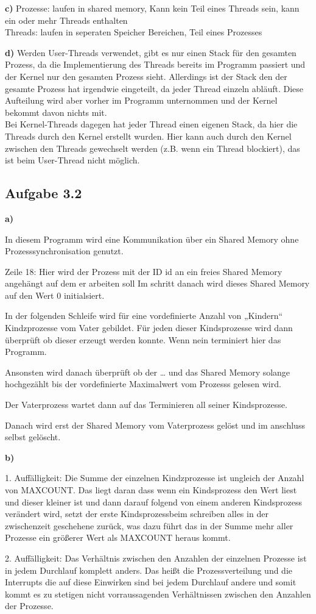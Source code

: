 \documentclass[a4paper,graphics,11pt]{article}
\newcommand{\aufgabe}[1]{\subsection*{Aufgabe #1}}
\begin{document}
\textbf{c)}
Prozesse: laufen in shared memory, Kann kein Teil eines Threads sein, kann ein oder mehr Threads enthalten\\
Threads: laufen in seperaten Speicher Bereichen, Teil eines Prozesses \\

\newpage

\textbf{d)}
Werden User-Threads verwendet, gibt es nur einen Stack für den gesamten Prozess, da die Implementierung des Threads bereits im Programm passiert und der Kernel nur den gesamten Prozess sieht. Allerdings ist der Stack den der gesamte Prozess hat irgendwie eingeteilt, da jeder Thread einzeln abläuft. Diese Aufteilung wird aber vorher im Programm unternommen und der Kernel bekommt davon nichts mit. \\
Bei Kernel-Threads dagegen hat jeder Thread einen eigenen Stack, da hier die Threads durch den Kernel erstellt wurden. Hier kann auch durch den Kernel zwischen den Threads gewechselt werden (z.B. wenn ein Thread blockiert), das ist beim User-Thread nicht möglich.

\aufgabe{3.2}

\textbf{a)}

In diesem Programm wird eine Kommunikation über ein Shared Memory ohne Prozesssynchronisation genutzt.

Zeile 18:
Hier wird der Prozess mit der ID id an ein freies Shared Memory angehängt auf dem er arbeiten soll
Im schritt danach wird dieses Shared Memory auf den Wert 0 initialsiert.

In der folgenden Schleife wird für eine vordefinierte Anzahl von „Kindern“ Kindzprozesse vom Vater gebildet.
Für jeden dieser Kindsprozesse wird dann überprüft ob dieser erzeugt werden konnte. Wenn nein terminiert hier das Programm.

Ansonsten wird danach überprüft ob der … und das Shared Memory solange hochgezählt bis der vordefinierte Maximalwert vom Prozesss gelesen wird.

Der Vaterprozess wartet dann auf das Terminieren all seiner Kindsprozesse.

Danach wird erst der Shared Memory vom Vaterprozess gelöst und im anschluss selbst gelöscht.


\textbf{b)}

1. Auffälligkeit:
Die Summe der einzelnen Kindzprozesse ist ungleich der Anzahl von MAXCOUNT. Das liegt daran dass wenn ein Kindsprozess den Wert liest und dieser kleiner ist und dann darauf folgend von einem anderen Kindsprozess verändert wird, setzt der erste Kindsprozessbeim schreiben alles in der zwischenzeit geschehene zurück, was dazu führt das in der Summe mehr aller Prozesse ein größerer Wert als MAXCOUNT heraus kommt.

2. Auffälligkeit:
Das Verhältnis zwischen den Anzahlen der einzelnen Prozesse ist in jedem Durchlauf komplett anders. Das heißt die Prozessverteilung und die Interrupts die auf diese Einwirken sind bei jedem Durchlauf andere und somit kommt es zu stetigen nicht vorraussagenden Verhältnissen zwischen den Anzahlen der Prozesse.
\end{document}

